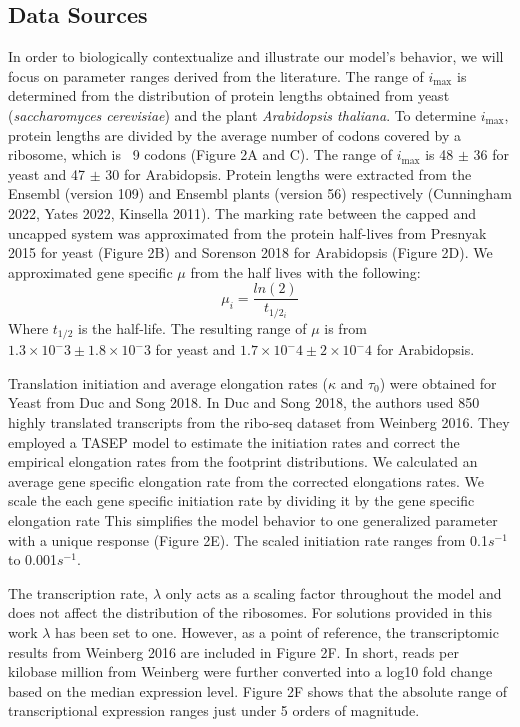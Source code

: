 \documentclass[review]{elsarticle}
\newcommand{\imax}{\ensuremath{i_{\max}}\xspace}
\begin{document}
\subsection{Data Sources}

In order to biologically contextualize and illustrate our model's behavior, we will focus on parameter ranges derived from the literature.
The range of \imax is determined from the distribution of protein lengths obtained from yeast (\textit{saccharomyces cerevisiae}) and the plant \textit{Arabidopsis thaliana}. To determine \imax, protein lengths are divided by the average number of codons covered by a ribosome, which is ~9 codons (Figure 2A and C). The range of \imax is  48 $\pm$ 36 for yeast and 47 $\pm$ 30 for Arabidopsis.
Protein lengths were extracted from the Ensembl (version 109) and Ensembl plants (version 56) respectively (Cunningham 2022, Yates 2022, Kinsella 2011).  
The marking rate between the capped and uncapped system was approximated from the protein half-lives from Presnyak 2015 for yeast (Figure 2B) and Sorenson 2018 for Arabidopsis (Figure 2D).
We approximated gene specific $\mu$ from the half lives with the following:
	\begin{equation*}
		\mu_i = \frac{ln(2)}{t_{1/2_i}}
	\end{equation*}
Where $t_{1/2}$ is the half-life. The resulting range of $\mu$ is from $1.3 \times 10^-3 \pm 1.8 \times 10^-3$ for yeast and $1.7 \times 10^-4 \pm 2 \times 10^-4$ for Arabidopsis. 

Translation initiation and average elongation rates ($\kappa$ and $\tau_0$) were obtained for Yeast from Duc and Song 2018. In Duc and Song 2018, the authors used 850 highly translated transcripts from the ribo-seq dataset from Weinberg 2016. They employed a TASEP model to estimate the initiation rates and correct the empirical elongation rates from the footprint distributions. We calculated an average gene specific elongation rate from the corrected elongations rates. We scale the each gene specific initiation rate by dividing it by the gene specific elongation rate This simplifies the model behavior to one generalized parameter with a unique response (Figure 2E).  The scaled initiation rate ranges from 0.1$s^{-1}$ to 0.001$s^{-1}$.

The transcription rate, $\lambda$ only acts as a scaling factor throughout the model and does not affect the distribution of the ribosomes. For solutions provided in this work $\lambda$ has been set to one. However, as a point of reference, the transcriptomic results from Weinberg 2016 are included in Figure 2F. In short, reads per kilobase million from Weinberg were further converted into a log10 fold change based on the median expression level. Figure 2F shows that the absolute range of transcriptional expression ranges just under 5 orders of magnitude.
\end{document}

